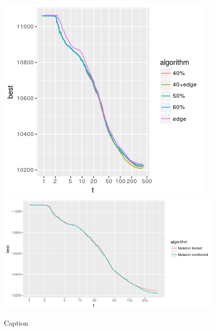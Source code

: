 \documentclass[a4paper,12pt,bibtotoc,titlepage, liststotoc,BCOR7mm,headsepline,pointlessnumbers]{scrbook}
\numberwithin{equation}{section}
\begin{document}
\begin{figure}[t!] 
    \vspace*{-.25cm}
  \centering
   \includegraphics[width=.8\textwidth]{img/edge frequency.png}
   \includegraphics[width=.8\textwidth]{img/forced_nonforced_mutation.png}

  \caption{Caption}
    \vspace*{-.5cm}
\end{figure}
\end{document}
